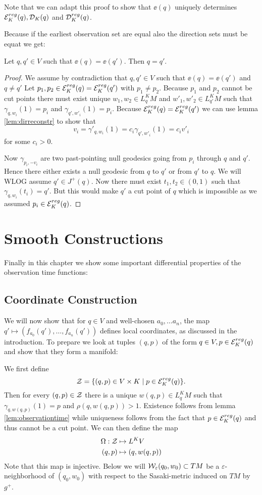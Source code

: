 Note that we can adapt this proof to show that $\ee(q)$ uniquely determines ${{\mathcal{E}}^{reg}_K}(q), {\mathcal{D}}_K(q)$ and ${\mathcal{D}}^{reg}_K(q)$.

Because if the earliest observation set are equal also the direction sets must be equat we get:
\begin{proposition}\label{prop:einj}
    Let $q,q'\in V$ such that $\ee(q)=\ee(q')$. Then $q=q'$.
\end{proposition}
\begin{proof}
    We assume by contradiction that $q,q'\in V$ such that $\ee(q)=\ee(q')$ and $q\neq q'$
    Let $p_1, p_2 \in {{\mathcal{E}}^{reg}_K}(q)={{\mathcal{E}}^{reg}_K}(q')$ with $p_1\neq p_2$. Because $p_1$ and $p_2$ cannot be cut points there must exist unique $w_1,w_2\in L^K_qM$ and $w'_1,w'_2\in L^K_{q'}M$ such that $\gamma_{q,w_i}(1)=p_i$ and $\gamma_{q',w'_i}(1)=p_i$. Because ${{\mathcal{E}}^{reg}_K}(q)={{\mathcal{E}}^{reg}_K}(q')$ we can use lemma \ref{lem:dirreconstr} to show that 
    \[
        v_i = \gamma'_{q,w_i}(1) = c_i\gamma_{q',w'_i}(1)=c_iv'_i
    \] for some $c_i>0$.

    Now $\gamma_{p_i,-v_i}$ are two past-pointing null geodesics going from $p_i$ through $q$ and $q'$. Hence there either exists a null geodesic from $q$ to $q'$ or from $q'$ to $q$. We will WLOG assume $q'\in J^+(q)$. 
    Now there must exist $t_1, t_2 \in (0,1)$ such that $\gamma_{q,w_i}(t_i)=q'$. But this would make $q'$ a cut point of $q$ which is impossible as we assumed $p_i\in {{\mathcal{E}}^{reg}_K}(q)$.
\end{proof}


\section{Smooth Constructions}
Finally in this chapter we show some important differential properties of the observation time functions:  
\subsection{Coordinate Construction}
We will now show that for $q\in V$ and well-chosen $a_0,\dots a_n$, the map $q'\mapsto (f_{a_0}(q'), \dots, f_{a_n}(q'))$ defines local coordinates, as discussed in the introduction.
To prepare we look at tuples $(q,p)$ of the form $q\in V, p\in {{\mathcal{E}}^{reg}_K}(q)$ and show that they form a manifold:
\begin{definition}[Coordinates on $V$]
    We first define 
    \[
        {\mathcal{Z}} = \{(q,p)\in V\times K \mid p\in {\mathcal{E}}_K^{reg}(q)\}.
    \] 
    Then for every $(q,p)\in {\mathcal{Z}}$ there is a unique $w(q,p)\in L^K_qM$ such that $\gamma_{q,w(q,p)}(1)=p$ and $\rho(q,w(q,p))>1$. Existence follows from lemma \ref{lem:observationtime} while uniqueness follows from the fact that $p\in {\mathcal{E}}_K^{reg}(q)$ and thus cannot be a cut point. 
    We can then define the map
    \begin{align*}
        \Omega:{\mathcal{Z}}&\mapsto L^KV\\
        (q,p)&\mapsto (q,w(q,p))
    \end{align*}
    Note that this map is injective.
    Below we will ${\mathcal{W}}_\varepsilon(q_0,w_0)\subset TM$ be a $\varepsilon$-neighborhood of $(q_0,w_0)$ with respect to the Sasaki-metric induced on $TM$ by $g^+$.
\end{definition}


